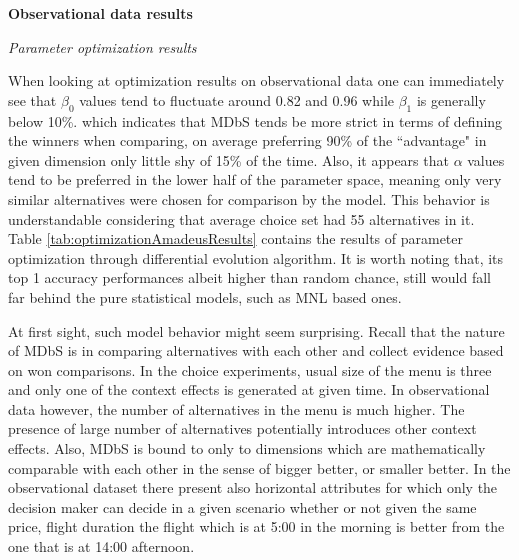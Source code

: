 \documentclass[a4paper,12pt]{article}
\begin{document}
\textbf{Observational data results}

\textit{Parameter optimization results}

When looking at optimization results on observational data one can immediately see that $\beta_0$ values tend to fluctuate around 0.82 and 0.96 while $\beta_1$ is generally below 10\%.  which indicates that MDbS tends be more strict in terms of defining the winners when comparing, on average preferring 90\% of the ``advantage" in given dimension only little shy of 15\% of the time. Also, it appears that $\alpha$ values tend to be preferred in the lower half of the parameter space, meaning only very similar alternatives were chosen for comparison by the model. This behavior is understandable considering that average choice set had 55 alternatives in it. Table \ref{tab:optimizationAmadeusResults} contains the results of parameter optimization through differential evolution algorithm. It is worth noting that, its top 1 accuracy performances albeit higher than random chance, still would fall far behind the pure statistical models, such as MNL based ones. 

At first sight, such model behavior might seem surprising. Recall that the nature of MDbS is in comparing alternatives with each other and collect evidence based on won comparisons. In the choice experiments, usual size of the menu is three and only one of the context effects is generated at given time. In observational data however, the number of alternatives in the menu is much higher. The presence of large number of alternatives potentially introduces other context effects. Also, MDbS is bound to only to dimensions which are mathematically comparable with each other in the sense of bigger better, or smaller better. In the observational dataset there present also horizontal attributes for which only the decision maker can decide in a given scenario whether or not given the same price, flight duration the flight which is at 5:00 in the morning is better from the one that is at 14:00 afternoon.
\end{document}
